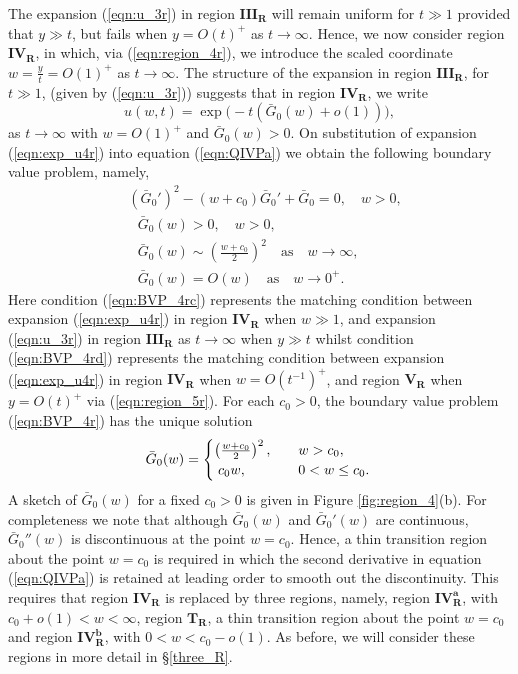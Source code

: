\documentclass[11pt,a4paper]{article}
\newcommand{\eeref}[1]{(\ref{eqn:#1})}
\newcommand{\eelab}[1]{\label{eqn:#1}}
\newcommand{\ffref}[1]{\ref{fig:#1}}
\def\beq{\begin{equation}}
\def\eeq{\end{equation}}
\begin{document}
The expansion \eeref{u_3r} in region $\mathbf{III_R}$ will remain uniform for $t \gg 1$ provided that $y \gg t$, but fails when $y=O(t)^+$ as $t \to \infty$. Hence, we now consider region $\mathbf{IV_R}$, in which, via \eeref{region_4r}, we introduce the scaled coordinate $w=\frac{y}{t}=O(1)^+$ as $t \to \infty$. 
%
The structure of the expansion in region $\mathbf{III_R}$, for $t \gg 1$, (given by \eeref{u_3r}) suggests that in region $\mathbf{IV_R}$,   we write
\beq \eelab{exp_u4r}
u(w,t) = \exp \Big( -t \left(  \bar{G}_0(w) +o(1) \right) \Big),
\eeq
as $t \to \infty$ with $w=O(1)^+$ and $\bar{G}_0(w) > 0$. On substitution of expansion \eeref{exp_u4r} into equation \eeref{QIVPa} we obtain the following boundary value problem, namely,
\begin{subequations} \eelab{BVP_4r}
  \begin{align}
& \left(\bar{G}_0' \right)^2 - (w + c_0) \bar{G}_0' + \bar{G}_0  = 0 ,  \quad w > 0 , \eelab{BVP_4ra}   \\
& \mbox{ } \bar{G}_0(w) > 0, \quad  w > 0 , \eelab{BVP_4rb} \\ 
& \mbox{ } \bar{G}_0(w) \sim \left(  \frac{w + c_0}{2} \right)^2  \quad \mbox{as} \quad w \to  \infty, \eelab{BVP_4rc}  \\
& \mbox{ } \bar{G}_0(w) = O(w)  \quad \mbox{as} \quad w \to  0^+. \eelab{BVP_4rd}
\end{align} 
\end{subequations}
Here condition \eeref{BVP_4rc} represents the matching condition between expansion \eeref{exp_u4r} in region $\mathbf{IV_R}$ when $ w \gg 1$, and expansion \eeref{u_3r} in region $\mathbf{III_R}$ as $t\to\infty$ when $y \gg t$ whilst condition \eeref{BVP_4rd} represents the matching condition between expansion \eeref{exp_u4r} in region $\mathbf{IV_R}$ when $ w=O(t^{-1})^+$, and region $\mathbf{V_R}$ when $y=O(t)^+$ via \eeref{region_5r}. For each $c_0> 0$, the boundary value problem \eeref{BVP_4r} has the unique solution 
\beq \eelab{BVP_4r_sol}
\bar{G}_0(w) = \begin{cases} \left( \frac{w+c_0}{2} \right)^2 , \quad &  w > c_0 ,\\
  \; c_0 w , \quad &  0 < w \leq c_0.  \end{cases} \\
\eeq
A sketch of $\bar{G}_0(w)$ for a fixed $c_0>0$ is given in Figure \ffref{region_4}(b). For completeness we note that although $\bar{G}_0(w)$ and $\bar{G}_0'(w)$ are continuous, $\bar{G}_0''(w)$ is discontinuous at the point $w=c_0$. Hence, a thin transition region about the point $w=c_0$ is required in which the second derivative in equation \eeref{QIVPa} is retained at leading order to smooth out the discontinuity. This requires that region $\mathbf{IV_R}$ is replaced by three regions, namely, region $\mathbf{IV_R^a}$, with $c_0 + o(1) < w < \infty$, region $\mathbf{T_R}$, a thin transition region about the point $w=c_0$ and region $\mathbf{IV_R^b}$, with $0 < w < c_0 -o(1)$. As before, we will consider these regions in more detail 
in \S \ref{three_R}. 
\end{document}
